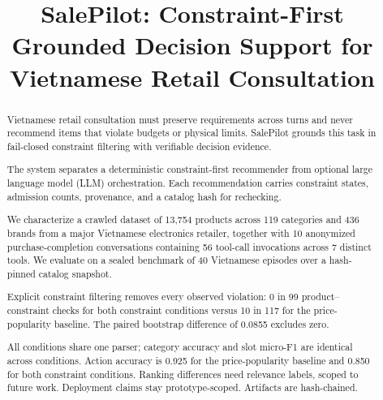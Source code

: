 \documentclass[conference,a4paper]{IEEEtran}
\begin{document}
\title{SalePilot: Constraint-First Grounded Decision Support for Vietnamese Retail Consultation}

\author{
\and
{}
}

\maketitle

\begin{abstract}
Vietnamese retail consultation must preserve requirements across turns and never recommend items that violate budgets or physical limits. SalePilot grounds this task in fail-closed constraint filtering with verifiable decision evidence.

The system separates a deterministic constraint-first recommender from optional large language model (LLM) orchestration. Each recommendation carries constraint states, admission counts, provenance, and a catalog hash for rechecking.

We characterize a crawled dataset of 13{,}754 products across 119 categories and 436 brands from a major Vietnamese electronics retailer, together with 10 anonymized purchase-completion conversations containing 56 tool-call invocations across 7 distinct tools. We evaluate on a sealed benchmark of 40 Vietnamese episodes over a hash-pinned catalog snapshot.

Explicit constraint filtering removes every observed violation: 0 in 99 product--constraint checks for both constraint conditions versus 10 in 117 for the price-popularity baseline. The paired bootstrap difference of 0.0855 excludes zero.

All conditions share one parser; category accuracy and slot micro-F1 are identical across conditions. Action accuracy is 0.925 for the price-popularity baseline and 0.850 for both constraint conditions. Ranking differences need relevance labels, scoped to future work. Deployment claims stay prototype-scoped. Artifacts are hash-chained.
\end{abstract}
\end{document}
